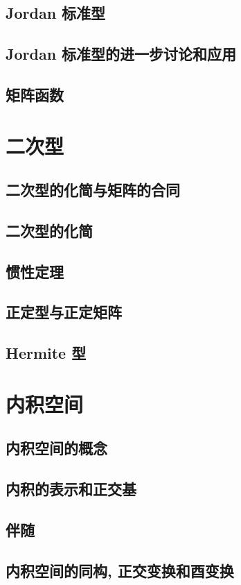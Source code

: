 \documentclass[a4paper, 11pt]{ctexbook}
\begin{document}
        \section{Jordan 标准型}
        \section{Jordan 标准型的进一步讨论和应用}
        \section{矩阵函数}
    \chapter{二次型}
        \section{二次型的化简与矩阵的合同}
        \section{二次型的化简}
        \section{惯性定理}
        \section{正定型与正定矩阵}
        \section{Hermite 型}
    \chapter{内积空间}
        \section{内积空间的概念}
        \section{内积的表示和正交基}
        \section{伴随}
        \section{内积空间的同构, 正交变换和酉变换}
\end{document}
